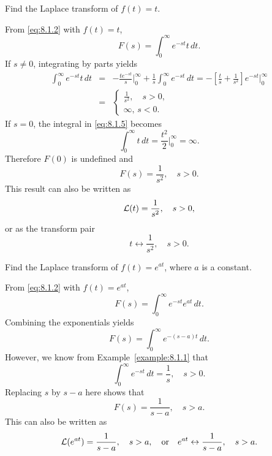 \documentclass{ximera}
\begin{document}
\begin{example}\label{example:8.1.2}
 Find the Laplace transform of $f(t)=t$.
\begin{explanation}
  From  \eqref{eq:8.1.2} with $f(t)=t$,
\begin{equation}\label{eq:8.1.5}
F(s)=\int_0^\infty e^{-st}t\,dt.
\end{equation}
If $s\neq 0$,  integrating by parts yields
\begin{eqnarray*}
\int_0^\infty e^{-st}t\,dt&=&-\frac{te^{-st}}{s}\bigg|_0^\infty
+\frac{1}{s}\int_0^\infty e^{-st}\,dt
=-\left[\frac{t}{s}+\frac{1}{s^2}\right]e^{-st}\bigg|_0^\infty
\\&=&\left\{\begin{array}{rr}\frac{1}{s^2},\quad s>0,\\
\infty,\,s<0.\end{array}\right.
\end{eqnarray*}
If $s=0$, the integral in  \eqref{eq:8.1.5} becomes
$$
\int_0^\infty t\,dt=\frac{t^2}{2}\bigg|_0^\infty=\infty.
$$
Therefore $F(0)$ is undefined and
$$
F(s)=\frac{1}{s^2},\quad s>0.
$$
This result can also be written as
$$
{\cal L}(t)=\frac{1}{s^2},\quad s>0,
$$
or as the transform pair
$$
t\leftrightarrow\frac{1}{s^2},\quad s>0.
$$
\end{explanation}
\end{example}

\begin{example}\label{example:8.1.3}
 Find the Laplace transform of $f(t)=e^{at}$, where $a$ is a constant.
\begin{explanation}
From  \eqref{eq:8.1.2} with $f(t)=e^{at}$,
$$
F(s)=\int_0^\infty e^{-st}e^{at}\,dt.
$$
Combining the exponentials yields
$$
F(s)=\int_0^\infty e^{-(s-a)t}\,dt.
$$
However, we know from Example~\ref{example:8.1.1}  that
$$
\int_0^\infty e^{-st}\,dt=\frac{1}{s},\quad s>0.
$$
Replacing $s$ by $s-a$ here shows that
$$
F(s)=\frac{1}{s-a},\quad s>a.
$$
This can also be written as
$$
{\cal L}(e^{at})=\frac{1}{s-a},\quad s>a, \quad\text{or}\quad
 e^{at}\leftrightarrow\frac{1}{s-a},\quad s>a.
$$
\end{explanation}
\end{example}
\end{document}
